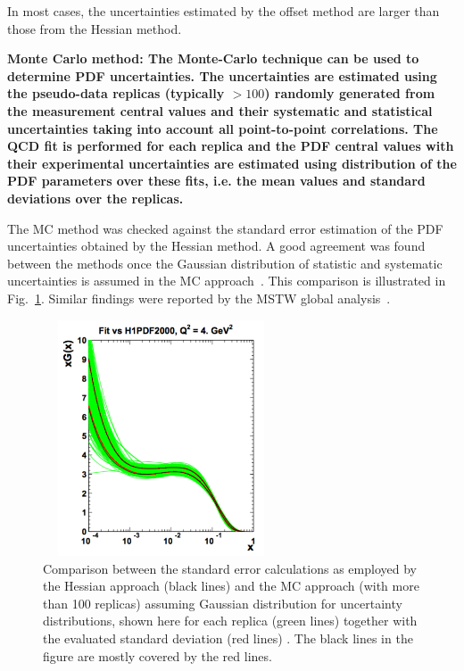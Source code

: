 \begin{description}
In most cases, the uncertainties estimated by the offset method are larger than 
those from the Hessian method.

\item \bf{Monte Carlo method:} \rm
The Monte-Carlo technique \cite{Giele:1998gw, mcmethod2} can be used to determine PDF uncertainties.
The uncertainties are estimated using the pseudo-data replicas (typically $>100$) 
randomly generated from the measurement central values and their systematic and statistical uncertainties 
taking into account all point-to-point correlations.
%
The QCD fit is performed for each replica and the PDF central values with their 
experimental uncertainties are estimated using distribution of the PDF parameters over these fits, i.e.
the mean values and standard deviations over the replicas.
%

The MC method was checked against the standard error estimation of the PDF uncertainties obtained by the Hessian method. 
A good agreement was found between the methods 
once the Gaussian distribution of statistic and systematic uncertainties is assumed in the MC 
approach~\cite{hera-lhc:report2009}.
This comparison is illustrated in Fig.~\ref{fig:mchessian}. 
Similar findings were reported by the MSTW global analysis~\cite{Watt:2012tq}. 
\begin{figure}[!ht]
 \centering
  \includegraphics[width=7cm,height=7cm]{mchessian.pdf}
  \caption{Comparison between the standard error calculations as employed by the Hessian approach (black lines) 
           and the MC approach (with more than 100 replicas) assuming Gaussian distribution for uncertainty 
           distributions, shown here for each replica 
          (green lines) together with the evaluated standard deviation (red lines) \cite{hera-lhc:report2009}.
          The black lines in the figure are mostly covered by the red lines.}
  \label{fig:mchessian}        
\end{figure}
\end{description}

